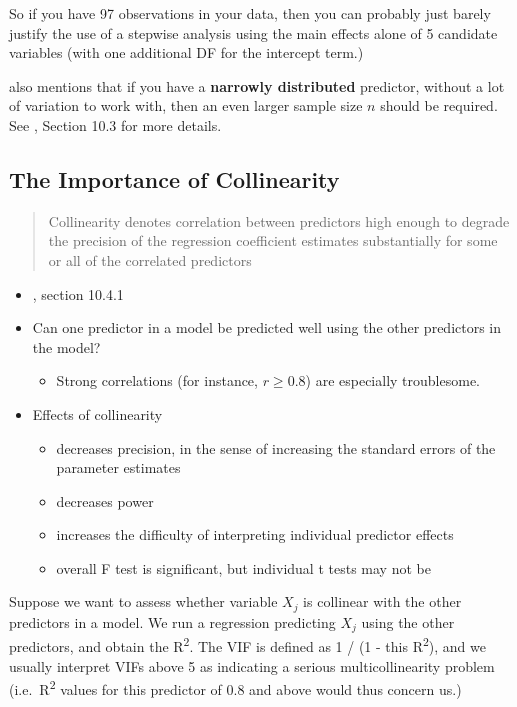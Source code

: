 \documentclass[]{book}
\providecommand{\tightlist}{%
  \setlength{\itemsep}{0pt}\setlength{\parskip}{0pt}}
\theoremstyle{definition}
\theoremstyle{definition}
\theoremstyle{definition}
\theoremstyle{remark}
\begin{document}
So if you have 97 observations in your data, then you can probably just
barely justify the use of a stepwise analysis using the main effects
alone of 5 candidate variables (with one additional DF for the intercept
term.)

\citet{Harrell2001} also mentions that if you have a \textbf{narrowly
distributed} predictor, without a lot of variation to work with, then an
even larger sample size \(n\) should be required. See
\citet{Vittinghoff2012}, Section 10.3 for more details.

\subsection{The Importance of
Collinearity}\label{the-importance-of-collinearity}

\begin{quote}
Collinearity denotes correlation between predictors high enough to
degrade the precision of the regression coefficient estimates
substantially for some or all of the correlated predictors
\end{quote}

\begin{itemize}
\item
  \citet{Vittinghoff2012}, section 10.4.1
\item
  Can one predictor in a model be predicted well using the other
  predictors in the model?

  \begin{itemize}
  \tightlist
  \item
    Strong correlations (for instance, \(r \geq 0.8\)) are especially
    troublesome.
  \end{itemize}
\item
  Effects of collinearity

  \begin{itemize}
  \tightlist
  \item
    decreases precision, in the sense of increasing the standard errors
    of the parameter estimates
  \item
    decreases power
  \item
    increases the difficulty of interpreting individual predictor
    effects
  \item
    overall F test is significant, but individual t tests may not be
  \end{itemize}
\end{itemize}

Suppose we want to assess whether variable \(X_j\) is collinear with the
other predictors in a model. We run a regression predicting \(X_j\)
using the other predictors, and obtain the R\textsuperscript{2}. The VIF
is defined as 1 / (1 - this R\textsuperscript{2}), and we usually
interpret VIFs above 5 as indicating a serious multicollinearity problem
(i.e.~R\textsuperscript{2} values for this predictor of 0.8 and above
would thus concern us.)
\end{document}
